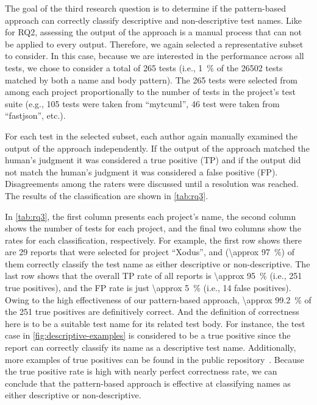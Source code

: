 The goal of the third research question is to determine if the pattern-based approach can correctly classify descriptive and non-descriptive test names.
%
Like for RQ2, assessing the output of the approach is a manual process that can not be applied to every output.
%
Therefore, we again selected a representative subset to consider.
%
In this case, because we are interested in the performance across all tests, we chose to consider a total of  \num{265} tests (i.e., \SI{1}{\percent} of the \num{26502} tests matched by both a name and body pattern).
%
The \num{265} tests were selected from among each project proportionally to the number of tests in the project's test suite (e.g., \num{105} tests were taken from \enquote{mytcuml}, \num{46} test were taken from \enquote{fastjson}, etc.).


For each test in the selected subset, each author again manually examined the output of the approach independently.
%
If the output of the approach matched the human's judgment it was considered a true positive (TP) and if the output did not match the human's judgment it was considered a false positive (FP).
%
Disagreements among the raters were discussed until a resolution was reached.
%
The results of the classification are shown in \cref{tab:rq3}.


In \cref{tab:rq3}, the first column presents each project’s name, the second column shows the number of tests for each project, and the final two columns show the rates for each classification, respectively.
For example, the first row shows there are \num{29} reports that were selected for project \enquote{Xodus}, and (\SI{\approx 97}{\percent}) of them correctly classify the test name as either descriptive or non-descriptive.
%
The last row shows that the overall TP rate of all reports is \SI{\approx 95}{\percent} (i.e., \num{251} true positives), and the FP rate is just \SI{\approx 5}{\percent} (i.e., \num{14} false positives).
%
Owing to the high effectiveness of our pattern-based approach, \SI{\approx 99.2}{\percent} of the \num{251} true positives are definitively correct.
%
And the definition of correctness here is to be a suitable test name for its related test body.
%
For instance, the test case in \cref{fig:descriptive-examples} is considered to be a true positive since the report can correctly classify its name as a descriptive test name.
%
Additionally, more examples of true positives can be found in the public repository~\cite{prototype}.
%
Because the true positive rate is high with nearly perfect correctness rate, we can conclude that the pattern-based approach is effective at classifying names as either descriptive or non-descriptive.



